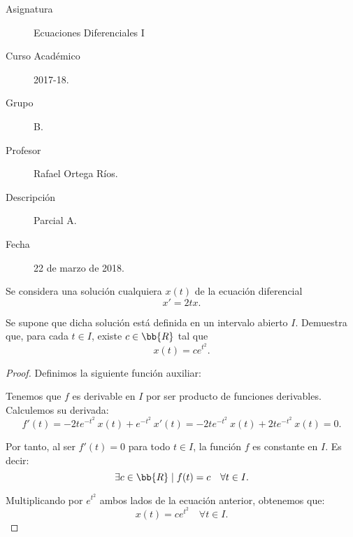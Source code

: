 \documentclass[12pt]{article}
\begin{document}

    
    

    \begin{description}
        \item[Asignatura] Ecuaciones Diferenciales I
        \item[Curso Académico] 2017-18.
        \item[Grupo] B.
        \item[Profesor] Rafael Ortega Ríos.
        \item[Descripción] Parcial A.
        \item[Fecha] 22 de marzo de 2018.
    
    \end{description}
    \newpage
    
\begin{ejercicio}
    Se considera una solución cualquiera \(x(t)\) de la ecuación diferencial
    \[
        x' = 2tx.
    \]

    Se supone que dicha solución está definida en un intervalo abierto \(I\). Demuestra que, para cada $t\in I$, existe \(c \in \bb{R}\) tal que
    \[
        x(t) = ce^{t^2}.
    \]

    \begin{proof}
        Definimos la siguiente función auxiliar:

        Tenemos que \(f\) es derivable en \(I\) por ser producto de funciones derivables. Calculemos su derivada:
        \begin{equation*}
            f'(t) = -2te^{-t^2}~x(t) + e^{-t^2}~x'(t) = -2te^{-t^2}~x(t) + 2te^{-t^2}~x(t) = 0.
        \end{equation*}

        Por tanto, al ser $f'(t)=0$ para todo \(t\in I\), la función \(f\) es constante en \(I\). Es decir:
        \begin{equation*}
            \exists c \in \bb{R} \mid f(t) = c \quad \forall t \in I.
        \end{equation*}

        Multiplicando por $e^{t^2}$ ambos lados de la ecuación anterior, obtenemos que:
        \begin{equation*}
            x(t) = ce^{t^2} \quad \forall t \in I.
        \end{equation*}
    \end{proof}
\end{ejercicio}
\end{document}
